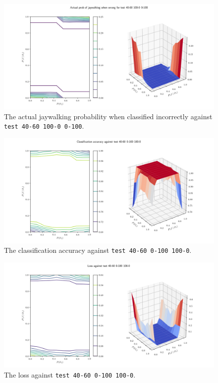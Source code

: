 \documentclass[paper=a4paper]{report}
\newcommand{\code}{\texttt}
\begin{document}
\begin{figure}[h]
    \centering
    \centerline{\includegraphics[scale=0.55]{test_40-60_100-0_0-100_jay_prob.png}}
    \caption[]{The actual jaywalking probability when classified incorrectly against \code{test 40-60 100-0 0-100}.}
    \label{fig:test_40-60_100-0_0-100_jay_prob_plot}
\end{figure}

% 
% 

\begin{figure}[h]
    \centering
    \centerline{\includegraphics[scale=0.55]{test_40-60_0-100_100-0_accuracy.png}}
    \caption[]{The classification accuracy against \code{test 40-60 0-100 100-0}.}
    \label{fig:test_40-60_0-100_100-0_accuracy_plot}
\end{figure}

\begin{figure}[h]
    \centering
    \centerline{\includegraphics[scale=0.55]{test_40-60_0-100_100-0_loss.png}}
    \caption[]{The loss against \code{test 40-60 0-100 100-0}.}
    \label{fig:test_40-60_0-100_100-0_loss_plot}
\end{figure}
\end{document}
